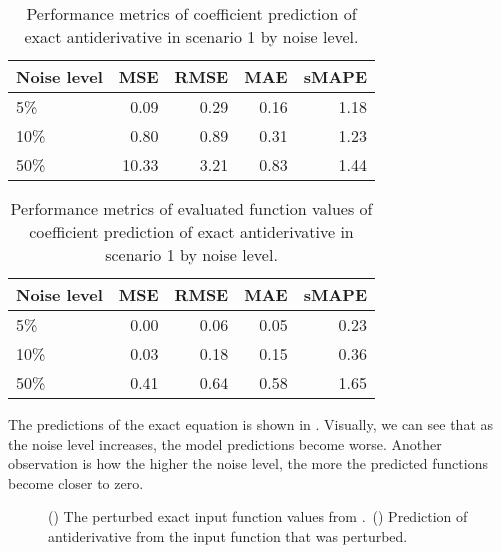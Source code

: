 \begin{table}[H]
  \caption{Performance metrics of coefficient prediction of exact antiderivative in scenario 1 by noise level.}\label{table:scenario_1_exact_spectral_metrics}
  \centering
  \begin{tabular}{lrrrr}
    \toprule
    Noise level & MSE   & RMSE & MAE  & sMAPE \\
    \midrule
    5\%         & 0.09  & 0.29 & 0.16 & 1.18  \\
    10\%        & 0.80  & 0.89 & 0.31 & 1.23  \\
    50\%        & 10.33 & 3.21 & 0.83 & 1.44  \\
    \bottomrule
  \end{tabular}
\end{table}

\begin{table}[H]
  \caption{Performance metrics of evaluated function values of coefficient prediction of exact antiderivative in scenario 1 by noise level.}\label{table:scenario_1_exact_function_metrics}
  \centering
  \begin{tabular}{lrrrr}
    \toprule
    Noise level & MSE  & RMSE & MAE  & sMAPE \\
    \midrule
    5\%         & 0.00 & 0.06 & 0.05 & 0.23  \\
    10\%        & 0.03 & 0.18 & 0.15 & 0.36  \\
    50\%        & 0.41 & 0.64 & 0.58 & 1.65  \\
    \bottomrule
  \end{tabular}
\end{table}

The predictions of the exact equation is shown in . Visually, we can see that as the noise level increases, the model predictions become worse. Another observation is how the higher the noise level, the more the predicted functions become closer to zero.

\begin{figure}[H]
  \centering
  \begin{subfigure}{\linewidth}
    \begin{adjustbox}{width=\linewidth}
      
    \end{adjustbox}
    \caption{}\label{fig:antiderivative_exact_input}
  \end{subfigure}
  \begin{subfigure}{\linewidth}
    \begin{adjustbox}{width=\linewidth}
      
    \end{adjustbox}
    \caption{}\label{fig:antiderivative_exact_prediction}
  \end{subfigure}
  \caption{() The perturbed exact input function values from .\ () Prediction of antiderivative from the input function that was perturbed.}\label{fig:antiderivative_exact}
\end{figure}

